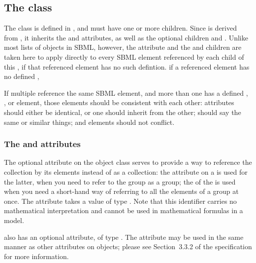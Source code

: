 \subsection{The  class}
\label{listofmembers-class}

The \ListOfMembers class is defined in , and must have one or more \Member children.  Since \ListOfMembers is derived from \SBase, it inherits the  and  attributes, as well as the optional children \Notes and \Annotation.  Unlike most lists of objects in SBML, however, the  attribute and the \Notes and \Annotation children are taken here to apply directly to every SBML element referenced by each child \Member of this \ListOfMembers, if that referenced element has no such defintion.   if a referenced element has no defined , 

If multiple \ListOfMembers {} reference the same SBML element, and more than one  has a defined , \Notes, or \Annotation element, those elements should be consistent with each other:   attributes should either be identical, or one should inherit from the other; \Notes should say the same or similar things; and \Annotation elements should not conflict.  

\begin{blockChanged}
\subsubsection{The \fixttspace{} and \fixttspace{} attributes}
\label{listofmembers-idname-attributes}

The optional  attribute on the \ListOfMembers object class serves to provide a way to reference the collection by its elements instead of as a collection:  the  attribute on a \Group is used for the latter, when you need to refer to the group as a group; the  of the \ListOfMembers is used when you need a short-hand way of referring to all the elements of a group at once.  The attribute takes a value of type .  Note that this identifier carries no mathematical interpretation and cannot be used in mathematical formulas in a model.

\ListOfMembers also has an optional  attribute, of type .  The  attribute may be used in the same manner as other  attributes on \sbmlthreecore objects; please see Section~3.3.2 of the \sbmlthreecore specification for more information.
\end{blockChanged}


